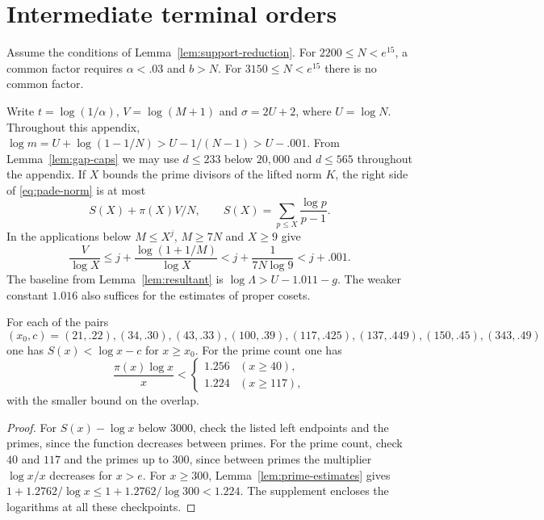 \section{Intermediate terminal orders}\label{app:middle-tail}

\begin{proposition}\label{prop:middle-tail}
Assume the conditions of Lemma~\ref{lem:support-reduction}.
For \(2200\le N<e^{15}\), a common factor requires
\(\alpha<.03\) and \(b>N\). For \(3150\le N<e^{15}\)
there is no common factor.
\end{proposition}

Write \(t=\log(1/\alpha)\), \(V=\log(M+1)\) and
\(\sigma=2U+2\), where \(U=\log N\).
Throughout this appendix,
\(\log m=U+\log(1-1/N)>U-1/(N-1)>U-.001\).
From Lemma~\ref{lem:gap-caps} we may use \(d\le233\) below
\(20{,}000\) and \(d\le565\) throughout the appendix.
If \(X\) bounds the prime divisors of the lifted norm \(K\), the
right side of \eqref{eq:pade-norm} is at most
\begin{equation}\label{eq:intermediate-prime-head}
 S(X)+\pi(X)V/N,\qquad S(X)=\sum_{p\le X}\frac{\log p}{p-1}.
\end{equation}
In the applications below \(M\le X^j\), \(M\ge7N\) and
\(X\ge9\) give
\[
 \frac{V}{\log X}
 \le j+\frac{\log(1+1/M)}{\log X}
 <j+\frac{1}{7N\log9}<j+.001 .
\]
The baseline from Lemma~\ref{lem:resultant} is
\(\log\Lambda> U-1.011-g\). The weaker constant \(1.016\)
also suffices for the estimates of proper cosets.

\begin{lemma}\label{lem:small-prime-sums}
For each of the pairs
\[
 (x_0,c)=(21,.22),(34,.30),(43,.33),(100,.39),
          (117,.425),(137,.449),(150,.45),(343,.49)
\]
one has \(S(x)<\log x-c\) for \(x\ge x_0\).
For the prime count one has
\[
 \frac{\pi(x)\log x}{x}<
 \begin{cases}
  1.256 & (x\ge40),\\
  1.224 & (x\ge117),
 \end{cases}
\]
with the smaller bound on the overlap.
\end{lemma}

\begin{proof}
For \(S(x)-\log x\) below \(3000\), check the listed left endpoints
and the primes, since the function decreases between primes.
For the prime count, check \(40\) and \(117\) and the primes
up to \(300\), since between primes the multiplier \(\log x/x\)
decreases for \(x>e\). For \(x\ge300\),
Lemma~\ref{lem:prime-estimates} gives
\(1+1.2762/\log x\le1+1.2762/\log300<1.224\).
The supplement encloses the logarithms at all these checkpoints.
\end{proof}

